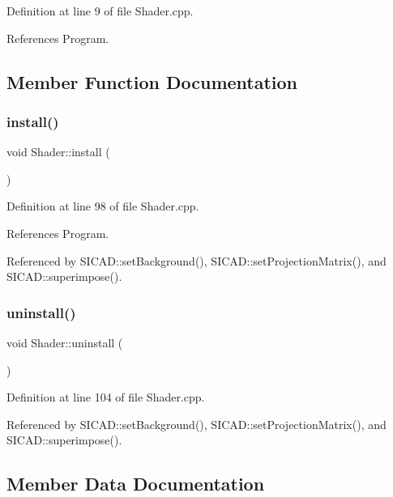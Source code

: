 Definition at line 9 of file Shader.\+cpp.



References Program.



\subsection{Member Function Documentation}
\mbox{\label{classShader_a8e53260be208ebf6c804a0d309e74097}} 
\subsubsection{\texorpdfstring{install()}{install()}}
{\footnotesize\ttfamily void Shader\+::install (\begin{DoxyParamCaption}{ }\end{DoxyParamCaption})}



Definition at line 98 of file Shader.\+cpp.



References Program.



Referenced by S\+I\+C\+A\+D\+::set\+Background(), S\+I\+C\+A\+D\+::set\+Projection\+Matrix(), and S\+I\+C\+A\+D\+::superimpose().

\mbox{\label{classShader_afa6fb33b37c9385cf62a836092da570b}} 
\subsubsection{\texorpdfstring{uninstall()}{uninstall()}}
{\footnotesize\ttfamily void Shader\+::uninstall (\begin{DoxyParamCaption}{ }\end{DoxyParamCaption})}



Definition at line 104 of file Shader.\+cpp.



Referenced by S\+I\+C\+A\+D\+::set\+Background(), S\+I\+C\+A\+D\+::set\+Projection\+Matrix(), and S\+I\+C\+A\+D\+::superimpose().



\subsection{Member Data Documentation}
\mbox{\label{classShader_a51b23253846bc84dcc2ef06612679012}} 
